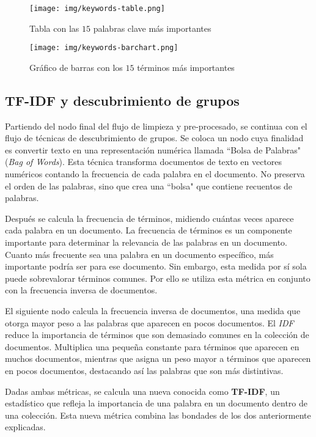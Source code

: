 \documentclass[12pt,letterpaper]{article}
\begin{document}
\begin{figure}[htp]
    \centering
    \texttt{[image: img/keywords-table.png]}
    \caption{Tabla con las $15$ palabras clave más importantes}
    \label{fig:keywords_table}
\end{figure}

\begin{figure}[htp]
    \centering
    \texttt{[image: img/keywords-barchart.png]}
    \caption{Gráfico de barras con los $15$ términos más importantes}
    \label{fig:keywords_barchart}
\end{figure}

\subsection{TF-IDF y descubrimiento de grupos}
Partiendo del nodo final del flujo de limpieza y pre-procesado, se continua con el flujo de técnicas de descubrimiento de grupos. Se coloca un nodo cuya finalidad es convertir texto en una representación numérica llamada ``Bolsa de Palabras" (\textit{Bag of Words}). Esta técnica transforma documentos de texto en vectores numéricos contando la frecuencia de cada palabra en el documento. No preserva el orden de las palabras, sino que crea una ``bolsa" que contiene recuentos de palabras. 

Después se calcula la frecuencia de términos, midiendo cuántas veces aparece cada palabra en un documento. La frecuencia de términos es un componente importante para determinar la relevancia de las palabras en un documento. Cuanto más frecuente sea una palabra en un documento específico, más importante podría ser para ese documento. Sin embargo, esta medida por sí sola puede sobrevalorar términos comunes. Por ello se utiliza esta métrica en conjunto con la frecuencia inversa de documentos.

El siguiente nodo calcula la frecuencia inversa de documentos, una medida que otorga mayor peso a las palabras que aparecen en pocos documentos. El \textit{IDF} reduce la importancia de términos que son demasiado comunes en la colección de documentos. Multiplica una pequeña constante para términos que aparecen en muchos documentos, mientras que asigna un peso mayor a términos que aparecen en pocos documentos, destacando así las palabras que son más distintivas.

Dadas ambas métricas, se calcula una nueva conocida como \textbf{TF-IDF}, un estadístico que refleja la importancia de una palabra en un documento dentro de una colección. Esta nueva métrica combina las bondades de los dos anteriormente explicadas.
\end{document}
